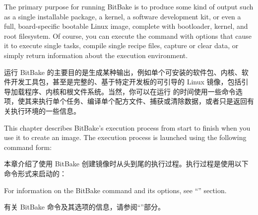 % 
% 
% 


The primary purpose for running BitBake is to produce some kind of output such as a single installable package, a kernel, a software development kit, or even a full, board-specific bootable Linux image, complete with bootloader, kernel, and root filesystem. Of course, you can execute the  command with options that cause it to execute single tasks, compile single recipe files, capture or clear data, or simply return information about the execution environment.

运行 BitBake 的主要目的是生成某种输出，例如单个可安装的软件包、内核、软件开发工具包，甚至是完整的、基于特定开发板的可引导的 Linux 镜像，包括引导加载程序、内核和根文件系统。当然，你可以在运行  的时间使用一些命令选项，使其来执行单个任务、编译单个配方文件、捕获或清除数据，或者只是返回有关执行环境的一些信息。

This chapter describes BitBake's execution process from start to finish when you use it to create an image. The execution process is launched using the following command form:

本章介绍了使用 BitBake 创建镜像时从头到尾的执行过程。执行过程是使用以下命令形式来启动的：


For information on the BitBake command and its options, see ``'' section.

有关 BitBake 命令及其选项的信息，请参阅``''部分。

